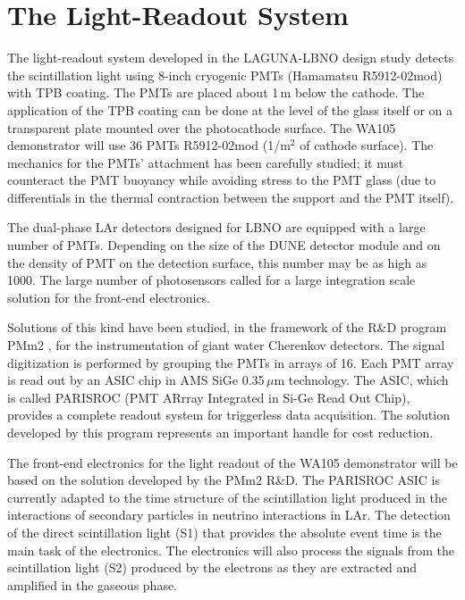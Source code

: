 \section{The Light-Readout System} 
\label{sec:detectors-fd-alt-light}

The light-readout system developed in the LAGUNA-LBNO design study
detects the scintillation light using 8-inch cryogenic
PMTs (Hamamatsu R5912-02mod) with TPB coating. The PMTs
are placed about 1\,m below the cathode.  The application of the TPB
coating can be done at the level of the glass itself or on a
transparent plate mounted over the photocathode surface. The WA105
demonstrator will use 36 PMTs R5912-02mod (1/m$^2$ of
cathode surface). The mechanics for the PMTs' attachment has been
carefully studied; it must counteract the PMT buoyancy while avoiding
stress to the PMT glass (due to differentials in the thermal
contraction between the support and the PMT itself).

The dual-phase LAr detectors designed for LBNO are equipped with a
large number of PMTs. Depending on the size of the DUNE detector module and on the
density of PMT on the detection surface, this number may be as high as
1000. The large number of photosensors called for a large integration
scale solution for the front-end electronics.

Solutions of this kind have been studied, in the framework of the
R\&D program PMm2 \cite{PMM2-1, PMM2-2}, for the instrumentation of
giant water Cherenkov detectors. The signal
digitization is performed by grouping the PMTs in arrays
of 16. Each PMT array is read out by an ASIC chip in AMS
SiGe 0.35\,$\mu$m technology. The ASIC, which is called PARISROC
(PMT ARrray Integrated in Si-Ge Read Out
Chip)\cite{Parisroc}, provides a complete readout system for
triggerless data acquisition. The solution developed by this program
represents an important handle for cost reduction.



The front-end electronics for the light readout of the WA105
demonstrator will be based on the solution developed by the PMm2
R\&D. The PARISROC ASIC is currently
adapted to the time structure of the scintillation light produced in
the interactions of secondary particles in neutrino interactions in
LAr. The detection of the direct scintillation light (S1) that
provides the absolute event time is the main task of the electronics.
The electronics will also process the signals from the scintillation
light (S2) produced by the electrons as they are extracted and
amplified in the gaseous phase.



